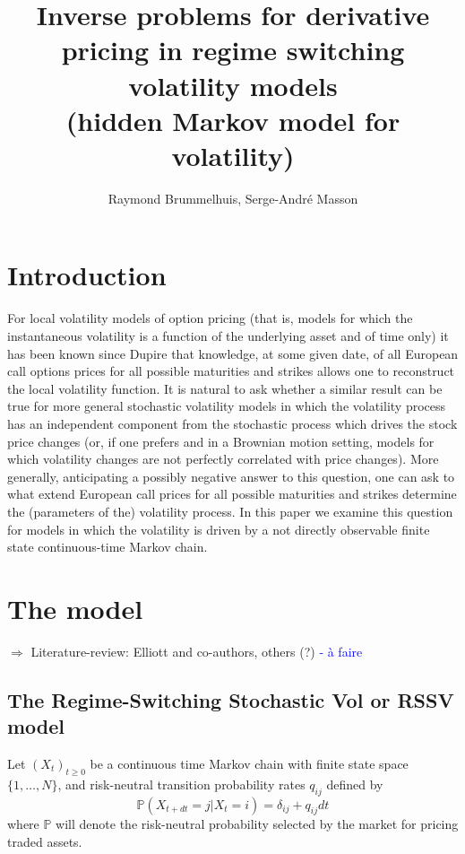 \documentclass[a4paper, 11pt]{amsart}
\newtheorem{definition and theorem}[theorem]{Definition and   
Theorem}
\begin{document}
\title[IP for regime-switching stochastic vol models]{Inverse problems for derivative pricing in regime switching volatility models \\
    (hidden Markov model for volatility)
}

\author{Raymond Brummelhuis, Serge-Andr\'e Masson}

\maketitle

\section{\bf Introduction}

For local volatility models of option pricing (that is, models for which the instantaneous volatility is a function of the underlying asset and of time only) it has been known since Dupire \cite{Du} that knowledge, at some given date, of all European call options prices for all possible maturities and strikes allows one to reconstruct the local volatility function. It is natural to ask whether a similar result can be true for more general stochastic volatility models in which the volatility process has an independent component from the stochastic process which drives the stock price changes (or, if one prefers and in a Brownian motion setting, models for which volatility changes are not perfectly correlated with price changes). More generally, anticipating a possibly negative answer to this question, one can ask to what extend European call prices for all possible maturities and strikes determine the (parameters of the) volatility process. In this paper we examine this question for models in which the volatility is driven by a not directly observable finite state continuous-time Markov chain.

\section{\bf The model}

$\Rightarrow $ Literature-review: Elliott and co-authors, others (?) \textcolor{blue}{  - \`a faire}
\medskip

\subsection{The Regime-Switching Stochastic Vol or RSSV model} Let $(X_t )_{t \geq 0 } $ be a continuous time Markov chain with finite state space  $\{ 1, \ldots , N \} $, and risk-neutral transition probability rates $q_{ij } $ defined by
\begin{equation}
    \mathbb{P } (X_{t + dt } = j | X_t = i ) = \delta _{ij } + q_{ij } dt
\end{equation}
where $\mathbb{P } $ will denote the risk-neutral probability selected by the market for pricing traded assets.
\medskip
\end{document}
